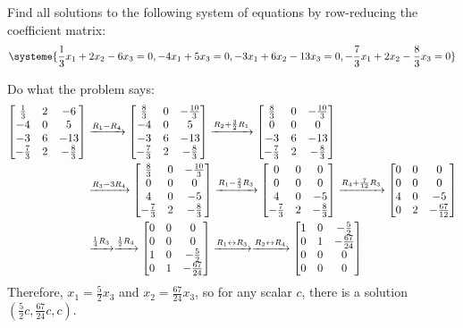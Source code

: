 \begin{xca}
  Find all solutions to the following system of equations by row-reducing the coefficient matrix:
  \[ \systeme{\frac13x_1 + 2x_2 - 6x_3 = 0, -4x_1 + 5x_3 = 0, -3x_1 + 6x_2 - 13x_3 = 0, -\frac73x_1 + 2x_2 - \frac83x_3 = 0} \]
\end{xca}
\begin{sol}
  Do what the problem says:
  \begin{equation*}
    \begin{split}
      \begin{bmatrix}\frac13&2&-6 \\ -4&0&5 \\ -3&6&-13 \\ -\frac73&2&-\frac83\end{bmatrix}
      & \xrightarrow{R_1 - R_4} \begin{bmatrix}\frac83&0&-\frac{10}3 \\ -4&0&5 \\ -3&6&-13 \\ -\frac73&2&-\frac83\end{bmatrix}
      \xrightarrow{R_2 + \frac32 R_1} \begin{bmatrix}\frac83&0&-\frac{10}3 \\ 0&0&0 \\ -3&6&-13 \\ -\frac73&2&-\frac83\end{bmatrix} \\
      & \xrightarrow{R_3 - 3R_4} \begin{bmatrix}\frac83&0&-\frac{10}3 \\ 0&0&0 \\ 4&0&-5 \\ -\frac73&2&-\frac83\end{bmatrix}
      \xrightarrow{R_1 - \frac23 R_3} \begin{bmatrix}0&0&0 \\ 0&0&0 \\ 4&0&-5 \\ -\frac73&2&-\frac83\end{bmatrix}
      \xrightarrow{R_4 + \frac7{12} R_3} \begin{bmatrix}0&0&0 \\ 0&0&0 \\ 4&0&-5 \\ 0&2&-\frac{67}{12}\end{bmatrix} \\
      & \xrightarrow{\frac14 R_3}
      \xrightarrow{\frac12 R_4} \begin{bmatrix}0&0&0 \\ 0&0&0 \\ 1&0&-\frac52 \\ 0&1&-\frac{67}{24}\end{bmatrix}
      \xrightarrow{R_1 \leftrightarrow R_3}
      \xrightarrow{R_2 \leftrightarrow R_4} \begin{bmatrix}1&0&-\frac52 \\ 0&1&-\frac{67}{24} \\ 0&0&0 \\ 0&0&0\end{bmatrix}
    \end{split}
  \end{equation*}
  Therefore, $x_1 = \frac52 x_3$ and $x_2 = \frac{67}{24} x_3$,
  so for any scalar $c$, there is a solution $(\frac52c, \frac{67}{24}c, c)$.
\end{sol}

